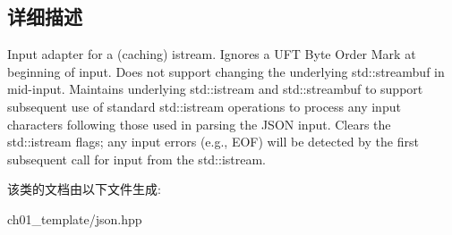 \subsection{详细描述}
Input adapter for a (caching) istream. Ignores a U\+FT Byte Order Mark at beginning of input. Does not support changing the underlying std\+::streambuf in mid-\/input. Maintains underlying std\+::istream and std\+::streambuf to support subsequent use of standard std\+::istream operations to process any input characters following those used in parsing the J\+S\+ON input. Clears the std\+::istream flags; any input errors (e.\+g., E\+OF) will be detected by the first subsequent call for input from the std\+::istream. 

该类的文档由以下文件生成\+:\begin{DoxyCompactItemize}
\item 
ch01\+\_\+template/json.\+hpp\end{DoxyCompactItemize}
